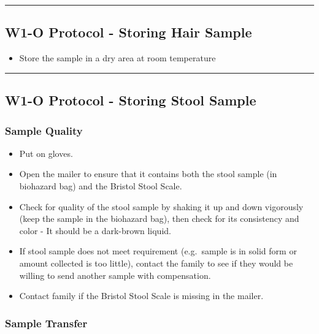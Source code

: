 \documentclass[]{book}
\providecommand{\tightlist}{%
  \setlength{\itemsep}{0pt}\setlength{\parskip}{0pt}}
\begin{document}
\begin{center}\rule{0.5\linewidth}{0.5pt}\end{center}

\hypertarget{w1-o-protocol---storing-hair-sample}{%
\subsection{W1-O Protocol - Storing Hair Sample}\label{w1-o-protocol---storing-hair-sample}}

\begin{itemize}
\tightlist
\item
  Store the sample in a dry area at room temperature
\end{itemize}

\begin{center}\rule{0.5\linewidth}{0.5pt}\end{center}

\hypertarget{w1-o-protocol---storing-stool-sample}{%
\subsection{W1-O Protocol - Storing Stool Sample}\label{w1-o-protocol---storing-stool-sample}}

\hypertarget{sample-quality-1}{%
\subsubsection{Sample Quality}\label{sample-quality-1}}

\begin{itemize}
\tightlist
\item
  Put on gloves.
\item
  Open the mailer to ensure that it contains both the stool sample (in biohazard bag) and the Bristol Stool Scale.
\item
  Check for quality of the stool sample by shaking it up and down vigorously (keep the sample in the biohazard bag), then check for its consistency and color - It should be a dark-brown liquid.
\item
  If stool sample does not meet requirement (e.g.~sample is in solid form or amount collected is too little), contact the family to see if they would be willing to send another sample with compensation.
\item
  Contact family if the Bristol Stool Scale is missing in the mailer.
\end{itemize}

\hypertarget{sample-transfer-1}{%
\subsubsection{Sample Transfer}\label{sample-transfer-1}}
\end{document}

